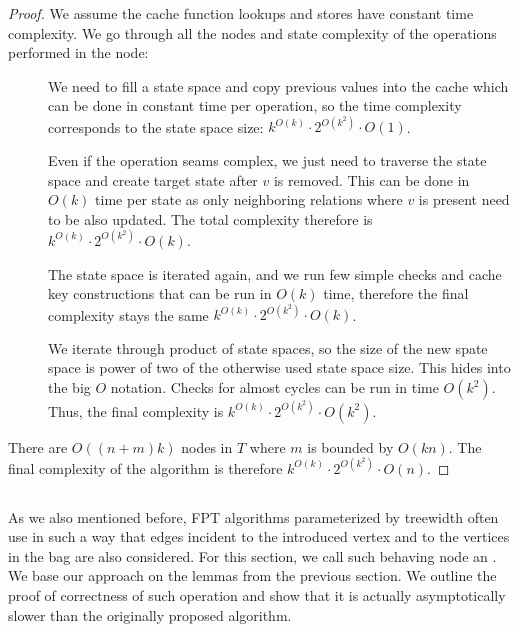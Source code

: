 \begin{proof}
	We assume the cache function lookups and stores have constant time complexity.
	We go through all the nodes and state complexity of the operations performed in the node:
	\begin{description}
		\item[\IntroduceVertexNode{}]
		      We need to fill a state space and copy previous values into the cache
		      which can be done in constant time per operation,
		      so the time complexity corresponds to the state space size:
		      \( {k}^{O(k)} \cdot 2^{O(k^2)} \cdot O(1) \).
		\item[\ForgetVertexNode{}]
		      Even if the operation seams complex, we just need to traverse the state space
		      and create target state after \( v \) is removed.
		      This can be done in \( O(k) \) time
		      per state as only neighboring relations where \( v \) is present
		      need to be also updated.
		      The total complexity therefore is
		      \( {k}^{O(k)} \cdot 2^{O(k^2)} \cdot O(k) \).
		\item[\IntroduceEdgeNode{}]
		      The state space is iterated again, and we run few simple checks and cache key constructions
		      that can be run in \( O(k) \) time, therefore the final complexity stays the same
		      \( {k}^{O(k)} \cdot 2^{O(k^2)} \cdot O(k) \).
		\item[\JoinNode{}]
		      We iterate through product of state spaces,
		      so the size of the new spate space is power of two
		      of the otherwise used state space size.
		      This hides into the big \( O \) notation.
		      Checks for almost cycles can be run in time \( O(k^2) \).
		      Thus, the final complexity is
		      \( {k}^{O(k)} \cdot 2^{O(k^2)} \cdot O(k^2) \).
	\end{description}
	There are \( O((n+m)k) \) nodes in \( T \) where \( m \) is bounded by \( O(kn) \).
	The final complexity of the algorithm is therefore
	\( {k}^{O(k)} \cdot 2^{O(k^2)} \cdot O(n) \).
\end{proof}
%

\subsection{\IntroduceVertexWithEdgesNode{}}

As we also mentioned before, FPT algorithms parameterized by treewidth
often use \IntroduceVertexNode{} in such a way
that edges incident to the introduced vertex and to
the vertices in the bag are also considered.
For this section, we call such behaving node an \IntroduceVertexWithEdgesNode{}.
%
We base our approach on the lemmas from the previous section.
We outline the proof of correctness of such operation and show
that it is actually asymptotically slower than the originally proposed algorithm.

